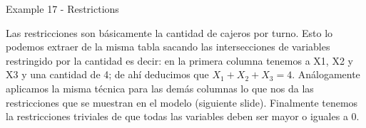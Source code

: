 \begin{frame}{Example 17 - Restrictions}

Las restricciones son básicamente la cantidad de cajeros por turno. Esto lo
podemos extraer de la misma tabla sacando las intersecciones de variables
restringido por la cantidad es decir: en la primera columna tenemos a X1, X2 y
X3 y una cantidad de 4; de ahí deducimos que $X_1 + X_2 + X_3 = 4$. Análogamente
aplicamos la misma técnica para las demás columnas lo que nos da las
restricciones que se muestran en el modelo (siguiente slide). Finalmente tenemos
la restricciones triviales de que todas las variables deben ser mayor o iguales
a 0.

\end{frame}
